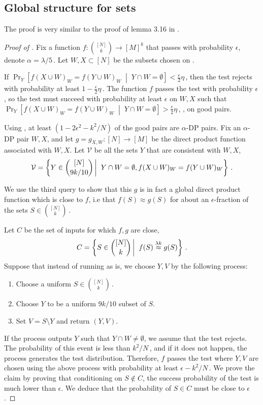 \documentclass{toc}
\newcommand{\Prob}[2][]{\Pr_{{#1}}\left[#2\right]} %
\newcommand{\given}{\;\middle\vert\;} %
\newcommand\sett[2]{\left\{ #1 \left| \; \vphantom{#1 #2} \right. #2  \right\}} %
\newcommand\f{f} %
\newcommand\setf{f} %
\newcommand{\g}{g} %
\newcommand\neql[1]{\stackrel{{#1}}{ \approx}} %
\newcommand{\sets}{\binom{[N]}{k}} %
\newcommand\cons{\mathcal{V}} %
\begin{document}
\subsection{Global structure for sets}\label{sec:global for sets}
%
The proof is very similar to the proof of lemma 3.16 in \cite{impagliazzo2012new}.
\begin{proof}[Proof of ]
	Fix a function $\setf:\sets\rightarrow[M]^k$ that passes  with probability $\epsilon$, denote $\alpha = 
	\lambda/5$\,. %
	Let $W,X\subset [N]$ be the subsets chosen on .
	
	If $\Prob[Y]{\f(X\cup W)_W = \f(Y\cup W)_W\given  Y\cap W=\emptyset} < \frac{\epsilon}{2}\eta$\,, then the test rejects with probability at least $1-\frac{\epsilon}{2}\eta$\,.
	The function $\setf$ passes the test with probability $\epsilon$, so the test must succeed with probability at least $\epsilon$ on $W,X$ such that $\Prob[Y]{\f(X\cup W)_W = \f(Y\cup W)_W\given  Y\cap W=\emptyset} > \frac{\epsilon}{2}\eta$\,, \ie, on good pairs.
	
	Using , at least $(1-2\epsilon^2-
	k^2/N %
	)$ of the good pairs are $\alpha$-DP pairs.
	Fix an $\alpha$-DP pair $W,X$, and let $\g=\g_{X,W}:[N]\rightarrow[M]$ be the direct product function associated with $W,X$. Let $\cons$ be all the sets $Y$ that are consistent with $W,X$,
	\[ \cons=\sett{Y\in\binom{[N]}{9k/10 }}{Y\cap W=\emptyset,\setf(X\cup W)_W=\setf(Y\cup W)_W}\,.\]%
	
	We use the third query to show that this $\g$ is in fact a global direct product function which is close to $\setf$, i.e that $\setf(S)\approx \g(S)$ for about an $\epsilon$-fraction of the sets $S\in\binom{[N]}{k}$\,.
	
	Let $C$ be the set of inputs for which $\f,\g$ are close,
	\[ C = \sett{S\in\binom{[N]}{k}}{\setf(S)\neql{\lambda k}\g(S)}\,. \]%
	Suppose that instead of running  as is, we choose $Y,V$ by the following process:
	\begin{enumerate}
		\item Choose a uniform $S\in\binom{[N]}{k}$\,.
		\item Choose $Y$ to be a uniform $9k/10$ subset of $S$.
		\item Set $V=S\setminus Y$ and return $(Y,V)$.
	\end{enumerate}
	If the process outputs $Y$ such that $Y\cap W\neq\emptyset$, we assume that the test rejects. The probability of this event is less than 
	$k^2/N$\,, %
and if it %
does not %
happen, %
 the process generates the test distribution. Therefore, $\setf$ passes the test where $Y,V$ are chosen using the above process with probability at least $\epsilon - 
	k^2/N$\,. %
	We prove the claim by proving that conditioning on $S\notin C$, the success probability of the test is much lower than $\epsilon$. We deduce that the probability of $S\in C$ must be close to $\epsilon$.
	

\end{proof}
\end{document}
